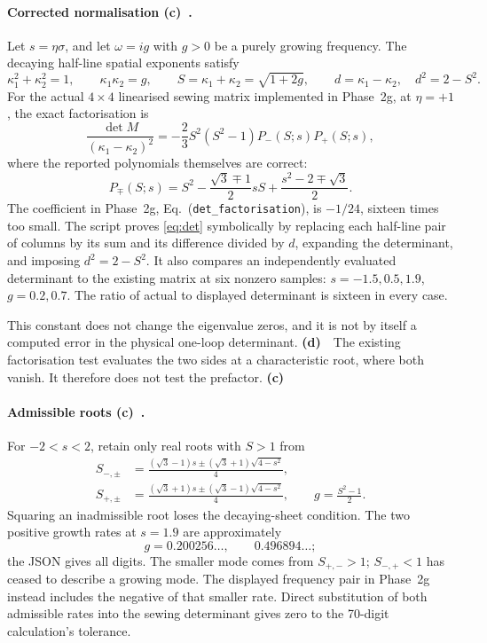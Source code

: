 \documentclass[11pt,a4paper]{article}
\newcommand{\Lc}{\textsf{\textbf{(c)}}\ }
\newcommand{\Ld}{\textsf{\textbf{(d)}}\ }
\begin{document}
\paragraph{Corrected normalisation \Lc.}
Let $s=\eta\sigma$, and let $\omega=i g$ with $g>0$ be a purely growing
frequency. The decaying half-line spatial exponents satisfy
\[
 \kappa_1^2+\kappa_2^2=1,\qquad
 \kappa_1\kappa_2=g,\qquad
 S=\kappa_1+\kappa_2=\sqrt{1+2g},\qquad
 d=\kappa_1-\kappa_2,\quad d^2=2-S^2.
\]
For the actual $4\times4$ linearised sewing matrix implemented in Phase~2g,
at $\eta=+1$, the exact factorisation is
\begin{equation}\label{eq:det}
 \frac{\det M}{(\kappa_1-\kappa_2)^2}
 =-\frac{2}{3}S^2(S^2-1)P_-(S;s)P_+(S;s),
\end{equation}
where the reported polynomials themselves are correct:
\[
 P_\mp(S;s)=S^2-\frac{\sqrt3\mp1}{2}sS
                   +\frac{s^2-2\mp\sqrt3}{2}.
\]
The coefficient in Phase~2g, Eq.~(\texttt{det\_factorisation}), is
$-1/24$, sixteen times too small. The script proves \eqref{eq:det}
symbolically by replacing each half-line pair of columns by its sum and
its difference divided by $d$, expanding the determinant, and imposing
$d^2=2-S^2$. It also compares an independently evaluated determinant to
the existing matrix at six nonzero samples:
$s=-1.5,0.5,1.9$, $g=0.2,0.7$.
The ratio of actual to displayed determinant is sixteen in every case.

This constant does not change the eigenvalue zeros, and it is not by itself
a computed error in the physical one-loop determinant. \Ld\ The existing
factorisation test evaluates the two sides at a characteristic root, where
both vanish. It therefore does not test the prefactor. \Lc

\paragraph{Admissible roots \Lc.}
For $-2<s<2$, retain only real roots with $S>1$ from
\begin{align*}
 S_{-,\pm}&=\frac{(\sqrt3-1)s\pm(\sqrt3+1)\sqrt{4-s^2}}4,\\
 S_{+,\pm}&=\frac{(\sqrt3+1)s\pm(\sqrt3-1)\sqrt{4-s^2}}4,
 \qquad g=\frac{S^2-1}{2}.
\end{align*}
Squaring an inadmissible root loses the decaying-sheet condition. The
two positive growth rates at $s=1.9$ are approximately
\[
 g=0.200256\ldots,\qquad 0.496894\ldots;
\]
the JSON gives all digits. The smaller mode comes from $S_{+,-}>1$;
$S_{-,+}<1$ has ceased to describe a growing mode. The displayed
frequency pair in Phase~2g instead includes the negative of that smaller
rate. Direct substitution of both admissible rates into the sewing
determinant gives zero to the 70-digit calculation's tolerance.
\end{document}
